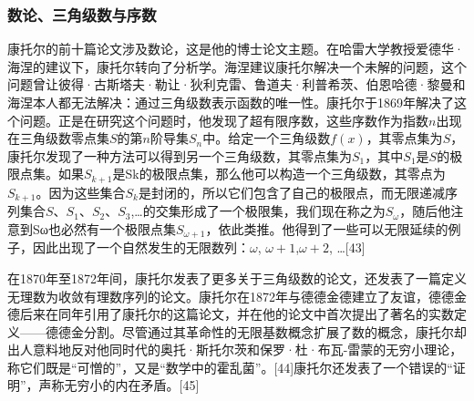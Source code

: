 \subsubsection{数论、三角级数与序数}  
康托尔的前十篇论文涉及数论，这是他的博士论文主题。在哈雷大学教授爱德华·海涅的建议下，康托尔转向了分析学。海涅建议康托尔解决一个未解的问题，这个问题曾让彼得·古斯塔夫·勒让·狄利克雷、鲁道夫·利普希茨、伯恩哈德·黎曼和海涅本人都无法解决：通过三角级数表示函数的唯一性。康托尔于1869年解决了这个问题。正是在研究这个问题时，他发现了超有限序数，这些序数作为指数\(n\)出现在三角级数零点集\(S\)的第\(n\)阶导集\(S_n\)中。给定一个三角级数\(f(x)\)，其零点集为\(S\)，康托尔发现了一种方法可以得到另一个三角级数，其零点集为\(S_1\)，其中\(S_1\)是\(S\)的极限点集。如果\(S_{k+1}\)是Sk的极限点集，那么他可以构造一个三角级数，其零点为\(S_{k+1}\)。因为这些集合\(S_k\)是封闭的，所以它们包含了自己的极限点，而无限递减序列集合\(S\)、\(S_1\)、\(S_2\)、\(S_3\),…的交集形成了一个极限集，我们现在称之为\(S_\omega\)，随后他注意到Sω也必然有一个极限点集\(S_{\omega+1}\)，依此类推。他得到了一些可以无限延续的例子，因此出现了一个自然发生的无限数列：\(\omega\), \(\omega+1\),\(\omega+2\), …[43]

在1870年至1872年间，康托尔发表了更多关于三角级数的论文，还发表了一篇定义无理数为收敛有理数序列的论文。康托尔在1872年与德德金德建立了友谊，德德金德后来在同年引用了康托尔的这篇论文，并在他的论文中首次提出了著名的实数定义——德德金分割。尽管通过其革命性的无限基数概念扩展了数的概念，康托尔却出人意料地反对他同时代的奥托·斯托尔茨和保罗·杜·布瓦-雷蒙的无穷小理论，称它们既是“可憎的”，又是“数学中的霍乱菌”。[44]康托尔还发表了一个错误的“证明”，声称无穷小的内在矛盾。[45]

